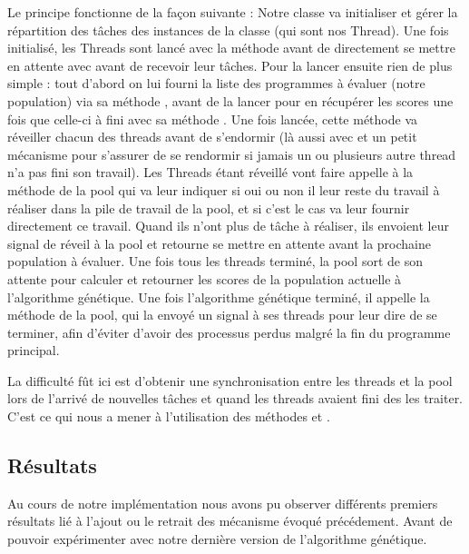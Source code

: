 \documentclass[a4paper,12pt]{article} %
\begin{document}
Le principe fonctionne de la façon suivante : Notre classe  va initialiser et gérer la répartition des tâches des instances de la classe  (qui sont nos Thread). Une fois initialisé, les Threads sont lancé avec la méthode  avant de directement se mettre en attente avec  avant de recevoir leur tâches.
Pour la lancer ensuite rien de plus simple : tout d'abord on lui fourni la liste des programmes à évaluer (notre population) via sa méthode , avant de la lancer pour en récupérer les scores une fois que celle-ci à fini avec sa méthode .
Une fois lancée, cette méthode va réveiller chacun des threads avant de s'endormir (là aussi avec  et un petit mécanisme pour s'assurer de se rendormir si jamais un ou plusieurs autre thread n'a pas fini son travail).
Les Threads étant réveillé vont faire appelle à la méthode  de la pool qui va leur indiquer si oui ou non il leur reste du travail à réaliser dans la pile de travail de la pool, et si c'est le cas va leur fournir directement ce travail.
Quand ils n'ont plus de tâche à réaliser, ils envoient leur signal de réveil à la pool et retourne se mettre en attente avant la prochaine population à évaluer.
Une fois tous les threads terminé, la pool sort de son attente pour calculer et retourner les scores de la population actuelle à l'algorithme génétique.
Une fois l'algorithme génétique terminé, il appelle la méthode  de la pool, qui la envoyé un signal à ses threads pour leur dire de se terminer, afin d'éviter d'avoir des processus perdus malgré la fin du programme principal.

La difficulté fût ici est d'obtenir une synchronisation entre les threads et la pool lors de l'arrivé de nouvelles tâches et quand les threads avaient fini des les traiter. C'est ce qui nous a mener à l'utilisation des méthodes  et .

\subsection{Résultats}
Au cours de notre implémentation nous avons pu observer différents premiers résultats lié à l'ajout ou le retrait des mécanisme évoqué précédement. Avant de pouvoir expérimenter avec notre dernière version de l'algorithme génétique.
\end{document}
